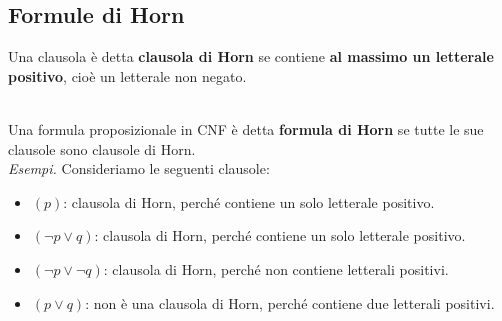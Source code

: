 \subsection{Formule di Horn}
\colorbox{SALZO}{\parbox{\dimexpr\linewidth-2\fboxsep}{
\begin{definition}
Una clausola è detta \textbf{clausola di Horn}
se contiene \textbf{al massimo un letterale positivo},
cioè un letterale non negato.
\end{definition}}}\smallskip\\
Una formula proposizionale in CNF è detta
\textbf{formula di Horn} se tutte le sue
clausole sono clausole di Horn.\smallskip\\
\textit{Esempi.}
Consideriamo le seguenti clausole:
\begin{itemize}
    \item $(p)$: clausola di Horn,
    perché contiene un solo letterale positivo.

    \item $(\neg p\lor q)$: clausola di Horn,
    perché contiene un solo letterale positivo.

    \item $(\neg p\lor\neg q)$: clausola di Horn,
    perché non contiene letterali positivi.

    \item $(p\lor q)$: non è una clausola
    di Horn, perché contiene due
    letterali positivi.
\end{itemize}

